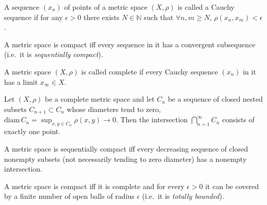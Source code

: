 \begin{defn}
A sequence $(x_n)$ of points of a metric space $(X,\rho)$ is called a Cauchy sequence if for any $\epsilon>0$ there exists $N\in\mathbb{N}$ such that $\forall n,m\geq N$, $\rho(x_n,x_m)<\epsilon$.
\end{defn}

\begin{prop}
    A metric space is compact iff every sequence in it has a convergent subsequence (i.e.~it is \emph{sequentially compact}).
\end{prop}

\begin{defn}[Completeness]
A metric space $(X,\rho)$ is called complete if every Cauchy sequence $(x_n)$ in it has a limit $x_\infty\in X$.
\end{defn}


\begin{thm}
Let $(X,\rho)$ be a complete metric space and let $C_n$ be a sequence of closed nested subsets $C_{n+1}\subset C_n$ whose diameters tend to zero, $\mathrm{diam}\,C_n=\sup_{x,y\in C_n} \rho(x,y) \to 0$. Then the intersection $\bigcap_{n=1}^\infty C_n$ consists of exactly one point.
\end{thm}


\begin{prop}
    A metric space is sequentially compact iff every decreasing sequence of closed nonempty subsets (not necessarily tending to zero diameter) has a nonempty intersection.
\end{prop}


\begin{thm}
    A metric space is compact iff it is complete and for every $\epsilon>0$ it can be covered by a finite number of open balls of radius $\epsilon$ (i.e.~it is \emph{totally bounded}).
\end{thm}


